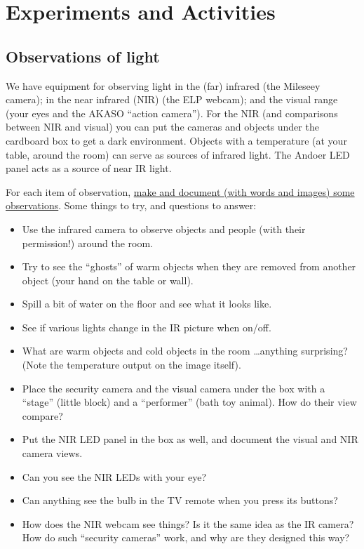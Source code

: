 \vspace{4cm}


\section{Experiments and Activities}


\subsection{Observations of light}

We have equipment for observing light in the (far) infrared (the Mileseey camera); in the near infrared (NIR) (the ELP webcam); and the visual range (your eyes and the AKASO ``action camera'').  For the NIR (and comparisons between NIR and visual) you can put the cameras and objects under the cardboard box to get a dark environment.  Objects with a temperature (at your table, around the room) can serve as sources of infrared light.  The Andoer LED panel acts as a source of near IR light.

\vspace{0.25cm}

\noindent For each item of observation, \underline{make and document (with words and images) some observations}.  Some things to try, and questions to answer:
	\begin{itemize}
	\item Use the infrared camera to observe objects and people (with their permission!) around the room.  
	\item Try to see the ``ghosts'' of warm objects when they are removed from another object (your hand on the table or wall).
	\item Spill a bit of water on the floor and see what it looks like.
	\item See if various lights change in the IR picture when on/off.
	\item What are warm objects and cold objects in the room \ldots anything surprising?  (Note the temperature output on the image itself).
	\item Place the security camera and the visual camera under the box with a ``stage'' (little block) and a ``performer'' (bath toy animal).  How do their view compare?
	\item Put the NIR LED panel in the box as well, and document the visual and NIR camera views.
	\item Can you see the NIR LEDs with your eye?  
	\item Can anything see the bulb in the TV remote when you press its buttons?
	\item How does the NIR webcam see things?  Is it the same idea as the IR camera?  How do such ``security cameras'' work, and why are they designed this way?
	\end{itemize}

